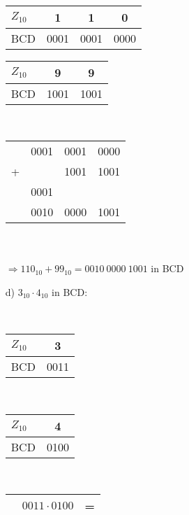 \documentclass{article}
\begin{document}
\begin{enumerate}
\begin{minipage}[t]{0.3\textwidth}
        	\hfill \\
        	\begin{tabular}{l|ccc}
        		$Z_{10}$ &  1   &  1   &  0   \\ \hline
        		BCD      & 0001 & 0001 & 0000
        	\end{tabular}
        	\begin{tabular}{l|cc}
        		$Z_{10}$ &  9   &  9   \\ \hline
        		BCD      & 1001 & 1001
        	\end{tabular}
        \end{minipage}
        \begin{minipage}[t]{0.2\textwidth}
        	\hfill \\
        	\begin{tabular}{crrr}
        		  &             0001 & 0001 & 0000 \\
        		+ &                  & 1001 & 1001 \\
        		  & \color{gray}0001 &      &      \\ \hline
        		  &             0010 & 0000 & 1001
        	\end{tabular}
        \end{minipage}\\\\
        $\Rightarrow 110_{10} +99_{10}=0010\: 0000 \:1001$ in BCD
        \newline
        \item[d)]$3_{10}\cdot 4_{10}$ in BCD:\\
        \begin{minipage}[t]{0.2\textwidth}
        	\hfill \\
        	\begin{tabular}{l|c}
        		$Z_{10}$ &  3   \\ \hline
        		BCD      & 0011
        	\end{tabular}\\
        	\begin{tabular}{l|c}
        		$Z_{10}$ &  4   \\ \hline
        		BCD      & 0100
        	\end{tabular}
        \end{minipage}
        \begin{minipage}[t]{0.4\textwidth}
        	\hfill \\
        	\begin{tabular}{crl}
        		  & $0011\cdot 0100$ & = \\ \hline

\end{tabular}
\end{minipage}
\end{enumerate}
\end{document}
